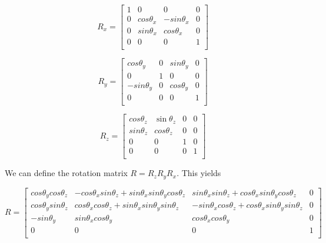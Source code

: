 \documentclass[titlepage,12pt]{report}
\begin{document}
\begin{equation}\label{rotx}
R_x = 
\begin{bmatrix}
1 & 0 & 0 & 0 \\
0 & cos\theta_x & -sin\theta_x & 0 \\
0 & sin\theta_x & cos\theta_x & 0 \\
0 & 0 & 0 & 1 \\
\end{bmatrix}
\end{equation}

\begin{equation}\label{roty}
R_y = 
\begin{bmatrix}
cos\theta_y & 0 & sin\theta_y & 0 \\
0 & 1 & 0 & 0 \\
-sin\theta_y  & 0 & cos\theta_y & 0 \\
0 & 0 & 0 & 1 \\
\end{bmatrix}
\end{equation}

\begin{equation}\label{rotz}
R_z = 
\begin{bmatrix}
cos\theta_z & \sin\theta_z & 0 & 0 \\
sin\theta_z & cos\theta_z & 0 & 0 \\
0 & 0 & 1 & 0 \\
0 & 0 & 0 & 1 \\
\end{bmatrix}
\end{equation}

We can define the rotation matrix $R = R_z R_y R_x$. This yields 

\begin{equation}\label{rot}
R = 
\begin{bmatrix}
cos\theta_y cos\theta_z 	& -cos\theta_x sin\theta_z + sin\theta_x sin\theta_y cos\theta_z & sin\theta_x sin\theta_z + cos\theta_x sin\theta_y cos\theta_z & 0 \\
cos\theta_y sin\theta_z 	& cos\theta_x cos\theta_z + sin\theta_x sin\theta_y sin\theta_z & -sin\theta_x cos\theta_z + cos\theta_x sin\theta_y sin\theta_z & 0 \\
-sin\theta_y 				& sin\theta_x cos\theta_y & cos\theta_x cos\theta_y & 0 \\
0 							& 0 & 0 & 1 \\
\end{bmatrix}
\end{equation}
\end{document}
